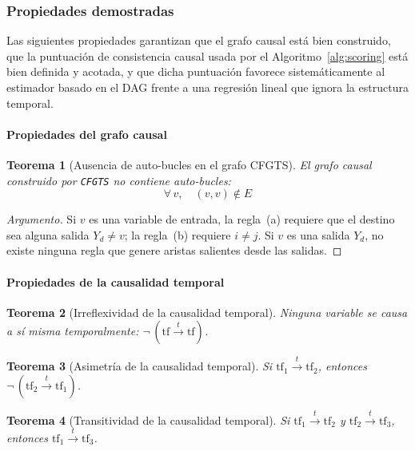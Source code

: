 \documentclass[12pt]{report} %
\newtheorem{theorem}{Teorema}
\begin{document}
\subsubsection{Propiedades demostradas}

Las siguientes propiedades garantizan que el grafo causal está bien construido, que la puntuación de consistencia causal usada por el Algoritmo~\ref{alg:scoring} está bien definida y acotada, y que dicha puntuación favorece sistemáticamente al estimador basado en el DAG frente a una regresión lineal que ignora la estructura temporal.

\paragraph{Propiedades del grafo causal}

\begin{theorem}[Ausencia de auto-bucles en el grafo CFGTS]
    El grafo causal construido por \texttt{CFGTS} no contiene auto-bucles:
    $$\forall\, v,\quad (v, v) \notin E$$
\end{theorem}
\begin{proof}[Argumento]
    Si $v$ es una variable de entrada, la regla~(a) requiere que el destino sea alguna salida $Y_d \neq v$; la regla~(b) requiere $i \neq j$. Si $v$ es una salida $Y_d$, no existe ninguna regla que genere aristas salientes desde las salidas.
\end{proof}

\paragraph{Propiedades de la causalidad temporal}

\begin{theorem}[Irreflexividad de la causalidad temporal]
    Ninguna variable se causa a sí misma temporalmente: $\neg\,(\text{tf} \xrightarrow{t} \text{tf})$.
\end{theorem}

\begin{theorem}[Asimetría de la causalidad temporal]
    Si $\text{tf}_1 \xrightarrow{t} \text{tf}_2$, entonces $\neg\,(\text{tf}_2 \xrightarrow{t} \text{tf}_1)$.
\end{theorem}

\begin{theorem}[Transitividad de la causalidad temporal]
    Si $\text{tf}_1 \xrightarrow{t} \text{tf}_2$ y $\text{tf}_2 \xrightarrow{t} \text{tf}_3$, entonces $\text{tf}_1 \xrightarrow{t} \text{tf}_3$.
\end{theorem}
\end{document}
